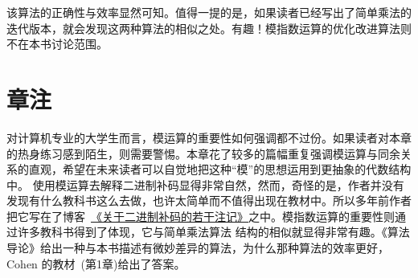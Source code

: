 该算法的正确性与效率显然可知。值得一提的是，如果读者已经写出了简单乘法的迭代版本，就会发现这两种算法的相似之处。有趣！模指数运算的优化改进算法则不在本书讨论范围。

\section*{章注}
对计算机专业的大学生而言，模运算的重要性如何强调都不过份。如果读者对本章的热身练习感到陌生，则需要警惕。本章花了较多的篇幅重复强调模运算与同余关系的直观，希望在未来读者可以自觉地把这种“模”的思想运用到更抽象的代数结构中。
使用模运算去解释二进制补码显得非常自然，然而，奇怪的是，作者并没有发现有什么教科书这么去做，也许太简单而不值得出现在教材中。所以多年前作者把它写在了博客~\href{https://www.jianshu.com/p/502d236116ca}{《关于二进制补码的若干注记》}之中。模指数运算的重要性则通过许多教科书得到了体现，它与简单乘法算法
结构的相似就显得非常有趣。《算法导论》给出一种与本书描述有微妙差异的算法，为什么那种算法的效率更好，Cohen 的教材~\cite{cohen2013course}(第1章)给出了答案。

